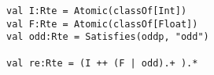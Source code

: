 \begin{lstlisting}[style=reclojureScala]
val I:Rte = Atomic(classOf[Int])
val F:Rte = Atomic(classOf[Float])
val odd:Rte = Satisfies(oddp, "odd")

val re:Rte = (I ++ (F | odd).+ ).*
\end{lstlisting}
